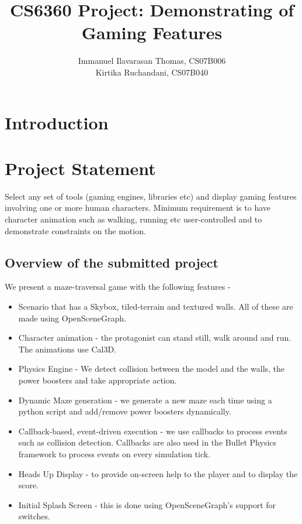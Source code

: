 \documentclass[a4paper]{article}
\title{\color{db} \textbf{CS6360 Project: Demonstrating of Gaming Features}}
\author{Immanuel Ilavarasan Thomas, CS07B006 \\  Kirtika Ruchandani, CS07B040}
\begin{document}
\sffamily
\maketitle

\section{\color{db}Introduction}



\section{\color{db}Project Statement}
Select any set of tools (gaming engines, libraries etc) and display gaming
features involving one or more human characters. Minimum requirement is to have 
character animation such as walking, running etc user-controlled and to
demonstrate constraints on the motion. 

\subsection{\color{db}Overview of the submitted project}
We present a maze-traversal game with the following features -
\begin{itemize}
\item Scenario that has a Skybox, tiled-terrain and textured walls. All of these are made using OpenSceneGraph.
\item Character animation - the protagonist can stand still, walk around and run. The animations use Cal3D.
\item Physics Engine - We detect collision between the model and the walls, the power boosters and take appropriate action.
\item Dynamic Maze generation - we generate a new maze each time using a python script and add/remove power boosters dynamically.
\item Callback-based, event-driven execution - we use callbacks to process events such as collision detection. Callbacks are also used in the Bullet Physics framework to process events on every simulation tick.
\item Heads Up Display - to provide on-screen help to the player and to display the score.
\item Initial Splash Screen - this is done using OpenSceneGraph's support for switches.
\end{itemize}
\end{document}
